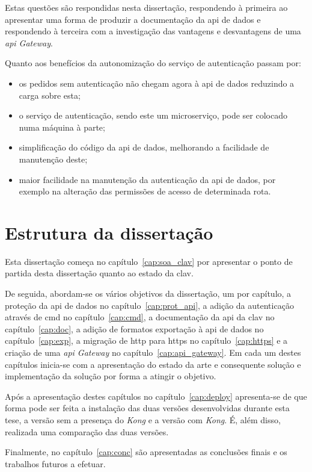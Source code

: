 Estas questões são respondidas nesta dissertação, respondendo à primeira ao apresentar uma forma de produzir a 
documentação da \acrshort{api} de dados e respondendo à terceira com a investigação das vantagens e desvantagens de uma 
\textit{\acrshort{api} Gateway}.

Quanto aos benefícios da autonomização do serviço de autenticação passam por:
\begin{itemize}
    \item os pedidos sem autenticação não chegam agora à \acrshort{api} de dados reduzindo a carga sobre esta;
    \item o serviço de autenticação, sendo este um microserviço, pode ser colocado numa máquina à parte;
    \item simplificação do código da \acrshort{api} de dados, melhorando a facilidade de manutenção deste;
    \item maior facilidade na manutenção da autenticação da \acrshort{api} de dados, por exemplo na alteração das permissões de acesso de determinada rota.
\end{itemize}

\section{Estrutura da dissertação}

Esta dissertação começa no capítulo~\ref{cap:soa_clav} por apresentar o ponto de partida desta dissertação quanto ao estado da \acrshort{clav}. 

De seguida, abordam-se os vários objetivos da dissertação, um por capítulo, a proteção da \acrshort{api} de dados no capítulo~\ref{cap:prot_api}, a adição da autenticação através de \acrshort{cmd} no capítulo~\ref{cap:cmd}, a documentação da \acrshort{api} da \acrshort{clav} no capítulo~\ref{cap:doc}, a adição de formatos exportação à \acrshort{api} de dados no capítulo~\ref{cap:exp}, a migração de \acrshort{http} para \acrshort{https} no capítulo~\ref{cap:https} e a criação de uma \textit{\acrshort{api} Gateway} no capítulo~\ref{cap:api_gateway}. Em cada um destes capítulos inicia-se com a apresentação do estado da arte e consequente solução e implementação da solução por forma a atingir o objetivo.

Após a apresentação destes capítulos no capítulo~\ref{cap:deploy} apresenta-se de que forma pode ser feita a instalação das duas versões desenvolvidas durante esta tese, a versão sem a presença do \textit{Kong} e a versão com \textit{Kong}. É, além disso, realizada uma comparação das duas versões.

Finalmente, no capítulo~\ref{cap:conc} são apresentadas as conclusões finais e os trabalhos futuros a efetuar.